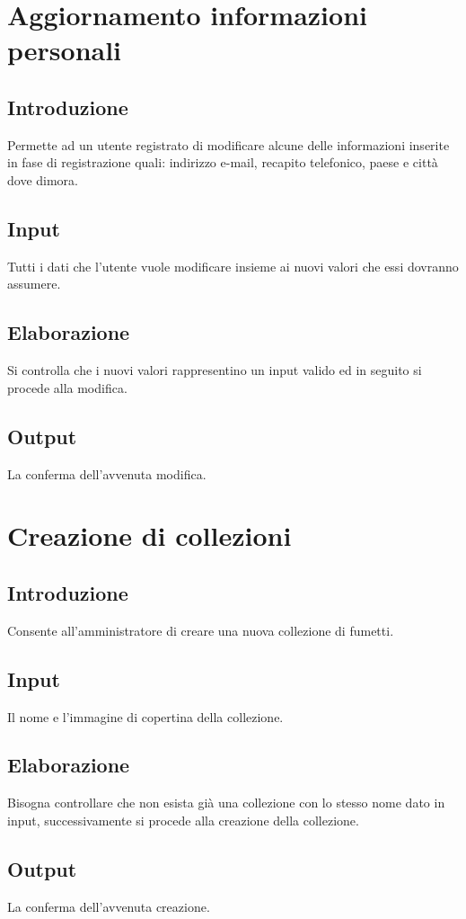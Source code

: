 \documentclass{scrreprt}
\begin{document}
\section{Aggiornamento informazioni personali}

\subsection*{Introduzione}
Permette ad un utente registrato di modificare alcune delle informazioni inserite in fase di registrazione quali: indirizzo
e-mail, recapito telefonico, paese e città dove dimora.
\subsection*{Input}
Tutti i dati che l'utente vuole modificare insieme ai nuovi valori che essi dovranno assumere.
\subsection*{Elaborazione}
Si controlla che i nuovi valori rappresentino un input valido ed in seguito si procede alla modifica.
\subsection*{Output}
La conferma dell'avvenuta modifica.

\section{Creazione di collezioni}

\subsection*{Introduzione}
Consente all'amministratore di creare una nuova collezione di fumetti.
\subsection*{Input}
Il nome e l'immagine di copertina della collezione.
\subsection*{Elaborazione}
Bisogna controllare che non esista già una collezione con lo stesso nome dato in input, successivamente
si procede alla creazione della collezione.
\subsection*{Output}
La conferma dell'avvenuta creazione.
\end{document}
